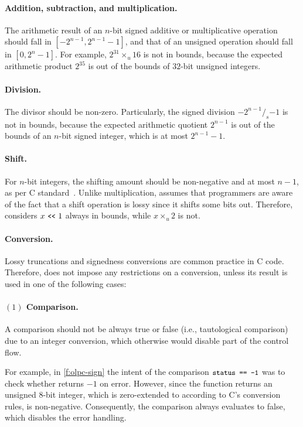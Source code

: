 \paragraph{Addition, subtraction, and multiplication.}
The arithmetic result of an $n$-bit signed additive or multiplicative
operation should fall in $[-2^{n-1}, 2^{n-1}-1]$,
and that of an unsigned operation should fall in
$[0, 2^{n}-1]$.
For example,
$2^{31}\times_u 16$ is not in bounds,
because the expected arithmetic product $2^{35}$ is out of the bounds
of $32$-bit unsigned integers.

\paragraph{Division.}
The divisor should be non-zero.  Particularly, the signed division
$-2^{n-1} /_s {-1}$ is not in bounds, because the expected arithmetic
quotient $2^{n-1}$ is out of the bounds of an $n$-bit signed integer,
which is at most $2^{n-1}-1$.

\paragraph{Shift.}
For $n$-bit integers, the shifting amount should be non-negative
and at most $n-1$, as per C standard~\cite[\subsectionautorefname~6.5.7]{c11}.
%
Unlike multiplication, \sys assumes that programmers are aware of
the fact that a shift operation is lossy since it shifts some bits
out.  Therefore, \sys considers $x \shl 1$ always in bounds, while
$x \times_u 2$ is not.

\paragraph{Conversion.}
Lossy truncations and signedness conversions are common practice in
C code.  Therefore,
\sys does not impose any restrictions on a conversion,
unless its result is used in one of the following cases:

\paragraph{$(1)$ Comparison.}
A comparison should not be always true or false (i.e., tautological
comparison) due to an integer conversion, which otherwise would
disable part of the control flow.

For example, in \autoref{f:olpc-sign} the intent of the comparison
$\cc{status == -1}$ was to check whether  returns
${-1}$ on error.  However, since the function returns an unsigned 8-bit
integer, which is zero-extended to  according to C's
conversion rules,  is non-negative.  Consequently,
the comparison always evaluates to false, which disables the error
handling.

